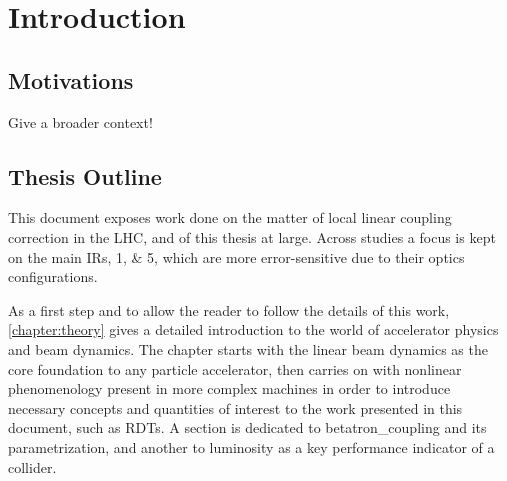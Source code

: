 \chapter{Introduction}
\label{chapter:introduction}


\section{Motivations}

Give a broader context!






\section{Thesis Outline}

This document exposes work done on the matter of local linear coupling correction in the LHC, and of this thesis at large.
Across studies a focus is kept on the main \glspl{IR}, \numlist{1;5}, which are more error-sensitive due to their optics configurations.

As a first step and to allow the reader to follow the details of this work, \cref{chapter:theory} gives a detailed introduction to the world of accelerator physics and beam dynamics.
The chapter starts with the linear beam dynamics as the core foundation to any particle accelerator, then carries on with nonlinear phenomenology present in more complex machines in order to introduce necessary concepts and quantities of interest to the work presented in this document, such as \glspl{RDT}.
A section is dedicated to \gls{betatron_coupling} and its parametrization, and another to \gls{luminosity} as a key performance indicator of a collider.

